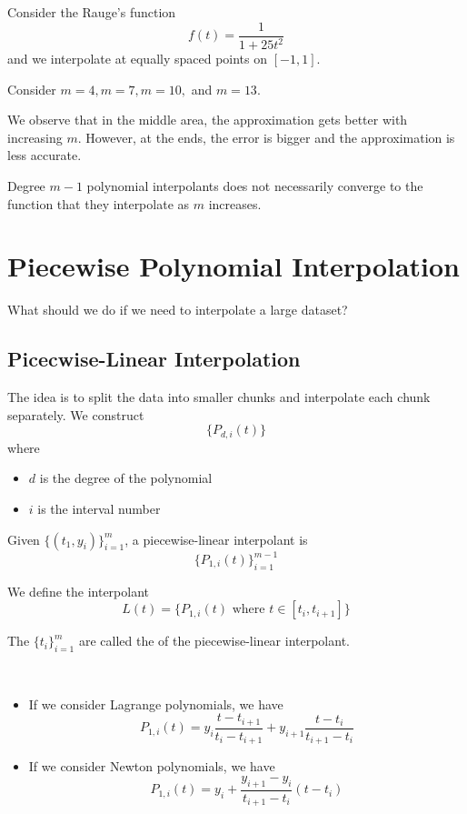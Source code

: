 \begin{example}
    Consider the Rauge's function \[
        f(t) = \frac{1}{1 + 25t^2}
    \] and we interpolate at equally spaced points on \( [-1, 1] \).

    Consider \( m = 4, m = 7, m = 10, \) and \( m = 13 \).


    We observe that in the middle area, the approximation gets better with increasing \( m \). However, at the ends, the error is bigger and the approximation is less accurate.
\end{example}

\begin{remark}
    Degree \( m - 1 \) polynomial interpolants does not necessarily converge to the function that they interpolate as \( m \) increases.
\end{remark}

\section{Piecewise Polynomial Interpolation}

What should we do if we need to interpolate a large dataset?

\subsection{Picecwise-Linear Interpolation}

The idea is to split the data into smaller chunks and interpolate each chunk separately. We construct  \[
    \{ P_{d,i}(t) \}
\] where
\begin{itemize}
    \item \( d \) is the degree of the polynomial
    \item \( i \) is the interval number
\end{itemize}

\begin{example}
    Given \( \{ (t_1, y_i ) \}_{i=1}^{m} \), a piecewise-linear interpolant is \[
        \{ P_{1,i}(t) \}_{i=1}^{m-1}
    \]

    We define the interpolant \[
        L(t) = \{ P_{1,i}(t) \text{ where } t \in [t_i, t_{i+1}] \}
    \]

    The \( \{ t_i \}_{i=1}^{m} \) are called the  of the piecewise-linear interpolant.

        {~~~}

    \begin{itemize}
        \item If we consider Lagrange polynomials, we have \[
                  P_{1,i}(t) = y_i \frac{t-t_{i+1}}{t_i - t_{i+1}} + y_{i+1} \frac{t-t_i}{t_{i+1} - t_i}
              \]

        \item If we consider Newton polynomials, we have \[
                  P_{1,i}(t) = y_i + \frac{y_{i+1} - y_i}{t_{i+1} - t_i} (t - t_i)
              \]
    \end{itemize}
\end{example}

